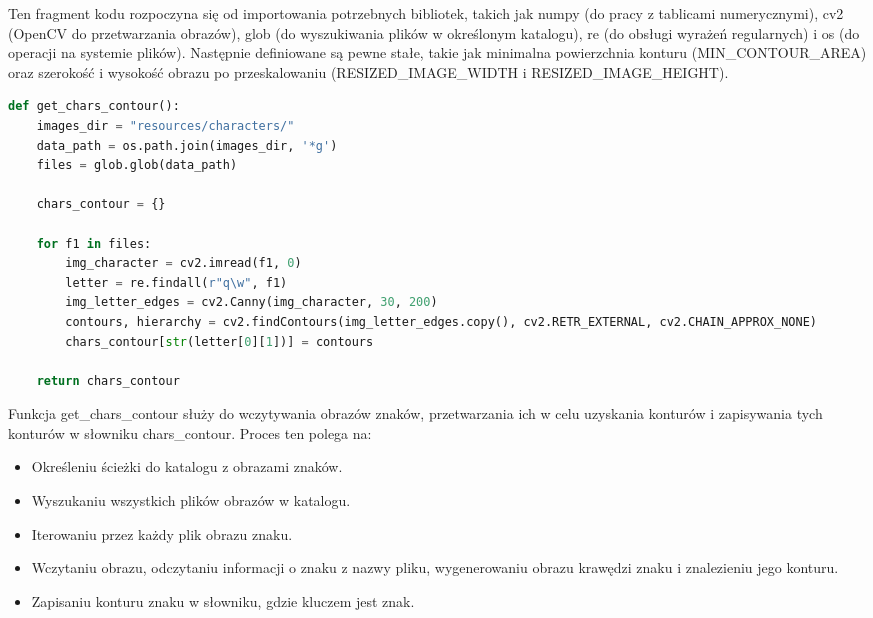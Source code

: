 \documentclass[12pt,a4paper,oneside]{article}
\theoremstyle{definition}
\numberwithin{equation}{section}
\begin{document}
Ten fragment kodu rozpoczyna się od importowania potrzebnych bibliotek, takich jak numpy (do pracy z tablicami numerycznymi), cv2 (OpenCV do przetwarzania obrazów), glob (do wyszukiwania plików w określonym katalogu), re (do obsługi wyrażeń regularnych) i os (do operacji na systemie plików). Następnie definiowane są pewne stałe, takie jak minimalna powierzchnia konturu (MIN{\_}CONTOUR{\_}AREA) oraz szerokość i wysokość obrazu po przeskalowaniu (RESIZED{\_}IMAGE{\_}WIDTH i RESIZED{\_}IMAGE{\_}HEIGHT).

\begin{adjustbox}{max width=\textwidth}
\begin{lstlisting}[language=Python]
def get_chars_contour():
    images_dir = "resources/characters/"
    data_path = os.path.join(images_dir, '*g')
    files = glob.glob(data_path)

    chars_contour = {}

    for f1 in files:
        img_character = cv2.imread(f1, 0)
        letter = re.findall(r"q\w", f1)
        img_letter_edges = cv2.Canny(img_character, 30, 200)
        contours, hierarchy = cv2.findContours(img_letter_edges.copy(), cv2.RETR_EXTERNAL, cv2.CHAIN_APPROX_NONE)
        chars_contour[str(letter[0][1])] = contours

    return chars_contour
\end{lstlisting} 
\end{adjustbox}

Funkcja get{\_}chars{\_}contour służy do wczytywania obrazów znaków, przetwarzania ich w celu uzyskania konturów i zapisywania tych konturów w słowniku chars{\_}contour. Proces ten polega na:



\begin{itemize}
  \item Określeniu ścieżki do katalogu z obrazami znaków.
  \item Wyszukaniu wszystkich plików obrazów w katalogu.
  \item Iterowaniu przez każdy plik obrazu znaku.
  \item Wczytaniu obrazu, odczytaniu informacji o znaku z nazwy pliku, wygenerowaniu obrazu krawędzi znaku i znalezieniu jego konturu.
  \item Zapisaniu konturu znaku w słowniku, gdzie kluczem jest znak.
\end{itemize}
\end{document}
